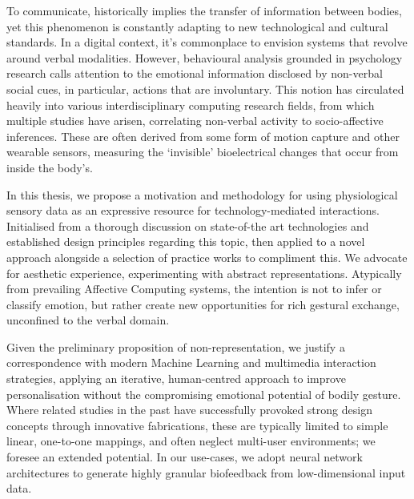 

To communicate, historically implies the transfer of information between bodies, yet this phenomenon is constantly adapting to new technological and cultural standards. In a digital context, it’s commonplace to envision systems that revolve around verbal modalities. However, behavioural analysis grounded in psychology research calls attention to the emotional information disclosed by non-verbal social cues, in particular, actions that are involuntary. This notion has circulated heavily into various interdisciplinary computing research fields, from which multiple studies have arisen, correlating non-verbal activity to socio-affective inferences. These are often derived from some form of motion capture and other wearable sensors, measuring the ‘invisible’ bioelectrical changes that occur from inside the body's. 

In this thesis, we propose a motivation and methodology for using physiological sensory data as an expressive resource for technology-mediated interactions. Initialised from a thorough discussion on state-of-the art technologies and established design principles regarding this topic, then applied to a novel approach alongside a selection of practice works to compliment this. We advocate for aesthetic experience, experimenting with abstract representations. Atypically from prevailing Affective Computing systems, the intention is not to infer or classify emotion, but rather create new opportunities for rich gestural exchange, unconfined to the verbal domain. 

Given the preliminary proposition of non-representation, we justify a correspondence with modern Machine Learning and multimedia interaction strategies, applying an iterative, human-centred approach to improve personalisation without the compromising emotional potential of bodily gesture. Where related studies in the past have successfully provoked strong design concepts through innovative fabrications, these are typically limited to simple linear, one-to-one mappings, and often neglect multi-user environments; we foresee an extended potential. In our use-cases, we adopt neural network architectures to generate highly granular biofeedback from low-dimensional input data.

